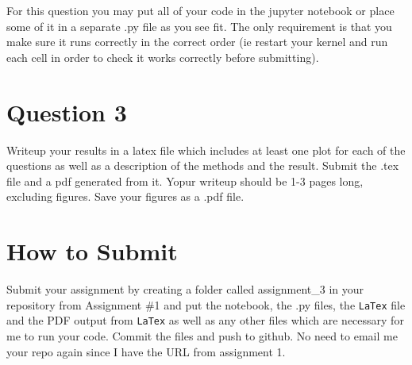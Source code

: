 \documentclass{article}
\begin{document}
For this question you may put all of your code in the jupyter notebook or place some of it in a separate .py file as you see fit. The only requirement is that you make sure it runs correctly in the correct order (ie restart your kernel and run each cell in order to check it works correctly before submitting).

\section*{Question 3}

Writeup your results in a latex file which includes at least one plot for each of the questions as well as a description of the methods and the result. Submit the .tex file and a pdf generated from it. Yopur writeup should be 1-3 pages long, excluding figures. Save your figures as a .pdf file.

\section*{How to Submit}

Submit your assignment by creating a folder called assignment\_3 in your repository from Assignment \#1 and put the notebook, the .py files, the \texttt{LaTex} file and the PDF output from \texttt{LaTex} as well as any other files which are necessary for me to run your code. Commit the files and push to github. No need to email me your repo again since I have the URL from assignment 1.
\end{document}
